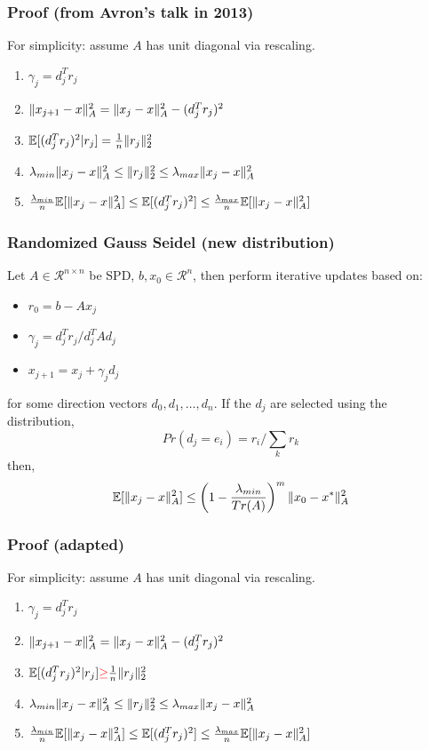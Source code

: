 \documentclass{beamer}
\DeclarePairedDelimiter{\norm}{\lVert}{\rVert}
\begin{document}
\begin{frame}
	\frametitle{Proof (from Avron's talk in 2013)}
    For simplicity: assume $A$ has unit diagonal via rescaling.
    \begin{enumerate}
        \item $\gamma_j = d_j^Tr_j$
        \item $\norm{x_{j+1} - x}_A^2 = \norm{x_j - x}_A^2 - (d_j^Tr_j)^2$
        \item $\mathbb{E}[(d_j^Tr_j)^2 | r_j] = \frac{1}{n} \norm{r_j}_2^2$
        \item $\lambda_{min} \norm{x_j - x}_A^2 \leq \norm{r_j}_2^2 \leq \lambda_{max} \norm{x_j - x}_A^2$
        \item $\frac{\lambda_{min}}{n}\mathbb{E}[\norm{x_j - x}_A^2] \leq \mathbb{E}[(d_j^Tr_j)^2] \leq \frac{\lambda_{max}}{n}\mathbb{E}[\norm{x_j - x}_A^2]$
    \end{enumerate}
\end{frame}

\begin{frame}
	\frametitle{Randomized Gauss Seidel (new distribution)}
    Let $A \in \mathcal{R}^{n\times n}$ be SPD, $b, x_0 \in \mathcal{R}^n$, then perform iterative updates based on:
        \begin{itemize}
            \item $r_0 = b - Ax_j$
            \item $\gamma_j = d^T_jr_j / d_j^TAd_j$
            \item $x_{j+1} = x_j + \gamma_j d_j$
        \end{itemize}
    for some direction vectors $d_0, d_1, \ldots, d_n$. If the $d_j$ are selected using the distribution,
        \begin{equation}
            Pr(d_j = e_i) = r_{i} / \sum_k r_k
        \end{equation}
    then,
        \begin{equation}
            \mathbb{E}[\norm{x_j - x }_A^2] \leq \left( 1 - \frac{\lambda_{min}}{Tr(A)}\right)^m \norm{x_0 - x^*}_A^2
        \end{equation}
\end{frame}

\begin{frame}
	\frametitle{Proof (adapted)}
    For simplicity: assume $A$ has unit diagonal via rescaling.
    \begin{enumerate}
        \item $\gamma_j = d_j^Tr_j$
        \item $\norm{x_{j+1} - x}_A^2 = \norm{x_j - x}_A^2 - (d_j^Tr_j)^2$
        \item $\mathbb{E}[(d_j^Tr_j)^2 | r_j] \color{red}{\geq}  \color{black} \frac{1}{n} \norm{r_j}_2^2$
        \item $\lambda_{min} \norm{x_j - x}_A^2 \leq \norm{r_j}_2^2 \leq \lambda_{max} \norm{x_j - x}_A^2$
        \item $\frac{\lambda_{min}}{n}\mathbb{E}[\norm{x_j - x}_A^2] \leq \mathbb{E}[(d_j^Tr_j)^2] \leq \frac{\lambda_{max}}{n}\mathbb{E}[\norm{x_j - x}_A^2]$
    \end{enumerate}
\end{frame}
\end{document}
